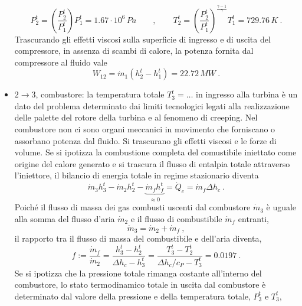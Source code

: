 \begin{itemize}
 \begin{equation}
   P_2^t = \left( \dfrac{P_2^t}{P_1^t} \right) P_1^t = 1.67 \cdot 10^6 \, Pa \qquad , \qquad
   T_2^t = \left( \dfrac{P_2^t}{P_1^t} \right)^{\frac{\gamma-1}{\gamma}} T_1^t = 729.76 \, K \ .
 \end{equation}
 Trascurando gli effetti viscosi sulla superficie di ingresso e di uscita del compressore, in assenza di scambi di calore, la potenza fornita dal compressore al fluido vale
\begin{equation}
 W_{12} = \dot{m}_1 ( h_2^t - h_1^t ) = 22.72 \, MW \ .
\end{equation}
 \item $2 \rightarrow 3$, combustore: la temperatura totale $T_3^t = \dots$ in ingresso alla turbina è un dato del problema determinato dai limiti tecnologici legati alla realizzazione delle palette del rotore della turbina e al fenomeno di creeping. Nel combustore non ci sono organi meccanici in movimento che forniscano o assorbano potenza dal fluido. Si trascurano gli effetti viscosi e le forze di volume. Se si ipotizza la combustione completa del comustibile iniettato come origine del calore generato e si trascura il flusso di entalpia totale attraverso l'iniettore, il bilancio di energia totale in regime stazionario diventa
\begin{equation}
  \dot{m}_3 h_3^t - \dot{m}_2 h_2^t - \underbrace{\dot{m}_f h_f^t}_{\approx 0} = \dot{Q}_c = \dot{m}_f \Delta h_c
 \ .
\end{equation}
Poiché il flusso di massa dei gas combusti uscenti dal combustore $\dot{m}_3$ è uguale alla somma del flusso d'aria $\dot{m}_2$ e il flusso di combustibile $\dot{m}_f$ entranti,
\begin{equation}
  \dot{m}_3 = \dot{m}_2 + \dot{m}_f \ ,
\end{equation}
il rapporto tra il flusso di massa del combustibile e dell'aria diventa,
\begin{equation}
 f := \dfrac{\dot{m}_f}{\dot{m}_2}
    = \dfrac{h_3^t - h_2^t}{\Delta h_c - h_3^t}
    = \dfrac{T_3^t - T_2^t}{\Delta h_c / c_P - T_3^t} = 0.0197  \ .
\end{equation}
Se si ipotizza che la pressione totale rimanga costante all'interno del combustore, lo stato termodinamico totale in uscita dal combustore è determinato dal valore della pressione e della temperatura totale, $P_3^t$ e $T_3^t$,

\end{itemize}
